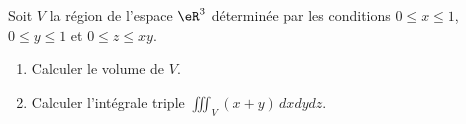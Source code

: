 
\begin{exercice}\label{exoOutilsMath-0121}

    Soit \( V\) la région de l'espace \( \eR^3\) déterminée par les conditions \( 0\leq x\leq 1\), \( 0\leq y\leq 1\) et \( 0\leq z\leq xy\).
    \begin{enumerate}
        \item
            Calculer le volume de \( V\).
        \item
            Calculer l'intégrale triple \( \iiint_V(x+y)\,dxdydz\).
    \end{enumerate}

\end{exercice}
